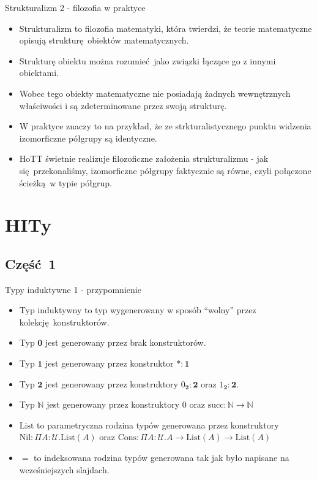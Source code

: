 \documentclass{beamer}
\newcommand{\U}{\mathcal{U}}
\begin{document}
\begin{frame}{Strukturalizm 2 - filozofia w praktyce}
\begin{itemize}
	\item Strukturalizm to filozofia matematyki, która twierdzi, że teorie matematyczne opisują strukturę obiektów matematycznych.
	\item Strukturę obiektu można rozumieć jako związki łączące go z innymi obiektami.
	\item Wobec tego obiekty matematyczne nie posiadają żadnych wewnętrznych właściwości i są zdeterminowane przez swoją strukturę.
	\item W praktyce znaczy to na przykład, że ze strkturalistycznego punktu widzenia izomorficzne półgrupy są identyczne.
	\item HoTT świetnie realizuje filozoficzne założenia strukturalizmu - jak się przekonaliśmy, izomorficzne półgrupy faktycznie są równe, czyli połączone ścieżką w typie półgrup. 
\end{itemize}

\end{frame}

\section{HITy}

\subsection{Część 1}

\begin{frame}{Typy induktywne 1 - przypomnienie}
\begin{itemize}
	\item Typ induktywny to typ wygenerowany w sposób ``wolny'' przez kolekcję konstruktorów.
	\item Typ $\textbf{0}$ jest generowany przez brak konstruktorów.
	\item Typ $\textbf{1}$ jest generowany przez konstruktor $* : \textbf{1}$
	\item Typ $\textbf{2}$ jest generowany przez konstruktory $0_{\textbf{2}} : \textbf{2}$ oraz $1_{\textbf{2}} : \textbf{2}$.
	\item Typ $\mathbb{N}$ jest generowany przez konstruktory $0$ oraz $\text{succ} : \mathbb{N} \to \mathbb{N}$
	\item $\text{List}$ to parametryczna rodzina typów generowana przez konstruktory $\text{Nil} : \Pi A : \U. \text{List}(A)$ oraz $\text{Cons} : \Pi A : \U. A \to \text{List}(A) \to \text{List}(A)$
	\item $=$ to indeksowana rodzina typów generowana tak jak było napisane na wcześniejszych slajdach.
\end{itemize}
\end{frame}
\end{document}
